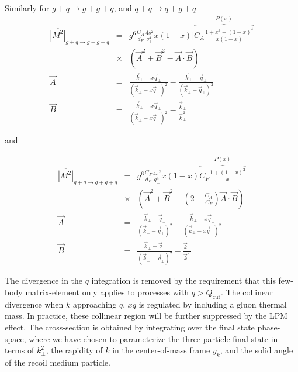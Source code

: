 Similarly for $g+q\rightarrow g+g+q$, and $q+q\rightarrow q+g+q$
\begin{eqnarray}
\overline{|M^2|}_{g+q\rightarrow g+g+q} &=& g^6 \frac{C_A}{d_F}\frac{4s^2}{q_\perp^4}x(1-x) ]\overbrace{C_A\frac{1+x^4+(1-x)^4}{x(1-x)}}^{P(x)}   \\\nonumber
&\times&\left(\vec{A}^2 + \vec{B}^2 - \vec{A}\cdot\vec{B}\right)\\
\vec{A} &=& \frac{\vec{k}_\perp - x\vec{q}_\perp}{(\vec{k}_\perp - x\vec{q}_\perp)^2} -  \frac{\vec{k}_\perp - \vec{q}_\perp}{(\vec{k}_\perp - \vec{q}_\perp)^2} \\
\vec{B} &=& \frac{\vec{k}_\perp - x\vec{q}_\perp}{(\vec{k}_\perp - x\vec{q}_\perp)^2} -  \frac{\vec{k}_\perp}{\vec{k}_\perp^2}
\end{eqnarray}

and

\begin{eqnarray}
\overline{|M^2|}_{g+q\rightarrow g+g+q} &=& g^6 \frac{C_F}{d_F}\frac{4s^2}{q_\perp^4}x(1-x) \overbrace{C_F\frac{1+(1-x)^2}{x}}^{P(x)}  \\\nonumber
&\times&\left(\vec{A}^2 + \vec{B}^2 - \left(2-\frac{C_A}{C_F}\right)\vec{A}\cdot\vec{B}\right)\\
\vec{A} &=& \frac{\vec{k}_\perp - \vec{q}_\perp}{(\vec{k}_\perp - \vec{q}_\perp)^2} -  \frac{\vec{k}_\perp - x\vec{q}_\perp}{(\vec{k}_\perp - x\vec{q}_\perp)^2} \\
\vec{B} &=& \frac{\vec{k}_\perp - \vec{q}_\perp}{(\vec{k}_\perp - \vec{q}_\perp)^2} -  \frac{\vec{k}_\perp}{\vec{k}_\perp^2}
\end{eqnarray}

The divergence in the $q$ integration is removed by the requirement that this few-body matrix-element only applies to processes with $q>Q_{\textrm{cut}}$.
The collinear divergence when $k$ approaching $q$, $xq$ is regulated by including a gluon thermal mass. 
In practice, these collinear region will be further suppressed by the LPM effect.
The cross-section is obtained by integrating over the final state phase-space, where we have chosen to parameterize the three particle final state in terms of $k_\perp^2$, the rapidity of $k$ in the center-of-mass frame $y_k$, and the solid angle of the recoil medium particle.


